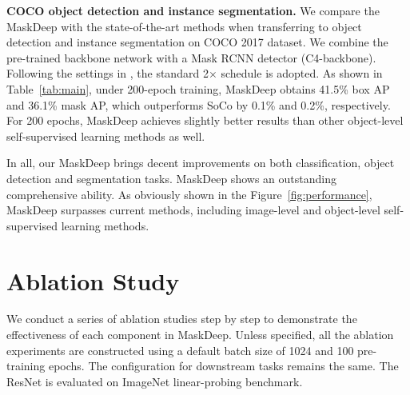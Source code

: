 \documentclass[10pt,twocolumn,letterpaper]{article}
\begin{document}
\noindent\textbf{COCO object detection and instance segmentation.}
We compare the  MaskDeep with the state-of-the-art methods when transferring to object detection and instance segmentation on COCO 2017 dataset. We combine the pre-trained backbone network with a Mask RCNN detector (C4-backbone)\cite{he2017mask}. Following the settings in \cite{xie2021detco,wei2021aligning}, the standard 2$\times$ schedule is adopted. 
As shown in Table~\ref{tab:main}, under 200-epoch training,  MaskDeep obtains 41.5\% box AP and 36.1\% mask AP, which outperforms SoCo by 0.1\% and 0.2\%, respectively. For 200 epochs,  MaskDeep achieves slightly better results than other object-level self-supervised learning methods as well. 

In all, our MaskDeep brings decent improvements on both classification, object detection and segmentation tasks. MaskDeep shows an outstanding comprehensive ability. As obviously shown in the Figure~\ref{fig:performance}, MaskDeep surpasses current methods, including image-level and object-level self-supervised learning methods.



\section{Ablation Study}

We conduct a series of ablation studies step by step to demonstrate the effectiveness of each component in MaskDeep.
Unless specified, all the ablation experiments are constructed using a default batch size of 1024 and 100 pre-training epochs. The configuration for downstream tasks remains the same. The ResNet is evaluated on ImageNet linear-probing benchmark.

\begin{table}[h]
	\centering
	\caption{Ablation studies results on ImageNet linear-prob benchmark.}
\label{tab:ablation}
\end{table}
\end{document}
